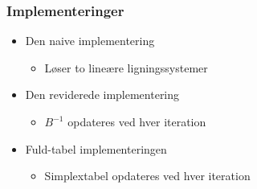 %
%
%
\begin{frame}
\frametitle{Implementeringer}
\begin{itemize}
\item Den naive implementering 
	\begin{itemize}
	\item Løser to lineære ligningssystemer
	\end{itemize}
\item Den reviderede implementering 
	\begin{itemize}
	\item $B^{-1}$ opdateres ved hver iteration
	\end{itemize}
\item Fuld-tabel implementeringen
	\begin{itemize}
	\item Simplextabel opdateres ved hver iteration
	\end{itemize} 
\end{itemize}
\end{frame}

